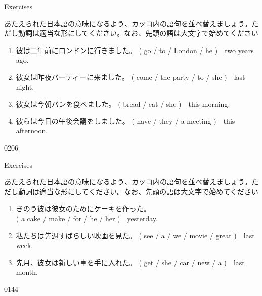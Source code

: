 \documentclass[aspectratio=169,xcolor={dvipsnames,table}]{beamer}
\newcommand{\myaudio}[1]{\href{#1}{\faVolumeUp}}
\begin{document}
\begin{frame}[plain]{Exercises}

{\small あたえられた日本語の意味になるよう、カッコ内の語句を並べ替えましょう。ただし動詞は適当な形にしてください。なお、先頭の語は大文字で始めてください}


\begin{enumerate}
 \item {\small 彼は二年前にロンドンに行きました。}
(  go / to / London / he )~~two years ago.\\
 \item {\small 彼女は昨夜パーティーに来ました。}\hspace{1\zw}
( come / the  party / to / she )~~last night.\\
 \item {\small 彼女は今朝パンを食べました。}\hspace{2.65\zw}
( bread / eat /  she  )~~this morning.\\
 \item {\small 彼らは今日の午後会議をしました。}\hspace{.75\zw}
( have / they / a meeting )~~this afternoon.\\
\end{enumerate}
\hfill{\tiny 0206}\,{\scriptsize \myaudio{./audio/025_past_do_15.mp3}}

\end{frame}
\begin{frame}[plain]{Exercises}

{\small あたえられた日本語の意味になるよう、カッコ内の語句を並べ替えましょう。ただし動詞は適当な形にしてください。なお、先頭の語は大文字で始めてください}

\begin{enumerate}
 \item {\small きのう彼は彼女のためにケーキを作った。}\\
\mbox{}\hfill{}( a cake / make / for / he / her )~~yesterday.\\
 \item {\small 私たちは先週すばらしい映画を見た。}
\hfill{}( see / a / we /  movie / great  )~~last week.\\
 \item {\small 先月、彼女は新しい車を手に入れた。}
( get / she / car  / new / a )~~last month.\\

\end{enumerate}
\hfill{\tiny 0144}\,{\scriptsize \myaudio{./audio/025_past_do_16.mp3}}

\end{frame}
\end{document}
